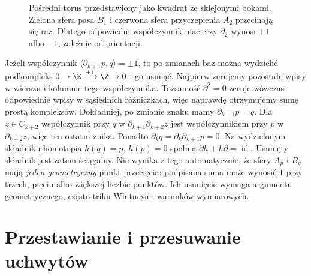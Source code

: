 \begin{figure}[htbp]
\centering
{}
\caption{Pośredni torus przedstawiony jako kwadrat
ze sklejonymi bokami. Zielona sfera pasa
$B_1$ i czerwona sfera przyczepienia
$A_2$ przecinają się raz. Dlatego odpowiedni
współczynnik macierzy $\partial_2$ wynosi
$+1$ albo $-1$, zależnie od orientacji.}
\label{fig:przeciecie-uchwytow-18}
\end{figure}

\begin{uwaga}
Jeżeli współczynnik
$\langle\partial_{k+1}p,q\rangle=\pm1$,
to po zmianach baz można wydzielić podkompleks
$0\to\Z\xrightarrow{\pm1}\Z\to0$ i go usunąć.
Najpierw zerujemy pozostałe wpisy w wierszu i kolumnie
tego współczynnika. Tożsamość $\partial^2=0$
zeruje wówczas odpowiednie wpisy w sąsiednich
różniczkach, więc naprawdę otrzymujemy sumę prostą
kompleksów. Dokładniej, po zmianie znaku mamy
$\partial_{k+1}p=q$. Dla $z\in C_{k+2}$ współczynnik przy $q$
w $\partial_{k+1}\partial_{k+2}z$ jest współczynnikiem przy $p$
w $\partial_{k+2}z$, więc ten ostatni znika.
Ponadto $\partial_k q=\partial_k\partial_{k+1}p=0$.
Na wydzielonym składniku homotopia $h(q)=p$, $h(p)=0$
spełnia $\partial h+h\partial=\operatorname{id}$.
Usunięty składnik jest zatem ściągalny.
Nie wynika z tego automatycznie, że
sfery $A_p$ i $B_q$ mają \emph{jeden
geometryczny} punkt przecięcia:
podpisana suma może wynosić $1$
przy trzech, pięciu albo większej
liczbie punktów. Ich usunięcie wymaga
argumentu geometrycznego, często
triku Whitneya i warunków wymiarowych.
\end{uwaga}

\section{Przestawianie i przesuwanie uchwytów}
\label{sec:ruchy-uchwytow-18}

